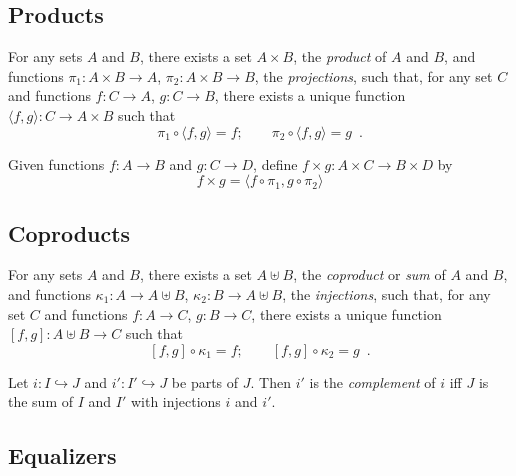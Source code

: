 \subsection{Products}

\begin{ax}[Products]
  For any sets $A$ and $B$, there exists a set $A \times B$, the
  \emph{product} of $A$ and $B$, and functions $\pi_1 : A \times B
  \rightarrow A$, $\pi_2 : A \times B \rightarrow B$, the \emph{projections},
  such that, for any set $C$ and functions $f : C \rightarrow A$, $g : C
  \rightarrow B$, there exists a unique function $\langle f, g \rangle : C
  \rightarrow A \times B$ such that
  \[ \pi_1 \circ \langle f, g \rangle = f; \qquad \pi_2 \circ \langle f,g
  \rangle
  = g \enspace . \]
\end{ax}

\begin{df}
  Given functions $f : A \rightarrow B$ and $g : C \rightarrow D$, define $f
  \times g : A \times C \rightarrow B \times D$ by
  \[ f \times g = \langle f \circ \pi_1, g \circ \pi_2 \rangle \]
\end{df}

\subsection{Coproducts}

\begin{ax}[Coproducts]
  For any sets $A$ and $B$, there exists a set $A \uplus B$, the
  \emph{coproduct} or \emph{sum} of $A$ and $B$, and functions $\kappa_1 : A
\rightarrow A
  \uplus B$, $\kappa_2 : B \rightarrow A \uplus B$, the \emph{injections},
  such that, for any set $C$ and functions $f : A \rightarrow C$, $g : B
  \rightarrow C$, there exists a unique function $[f, g] : A \uplus B
  \rightarrow
  C$ such that
  \[ [f,g] \circ \kappa_1 = f; \qquad [f,g] \circ \kappa_2 = g \enspace . \]
\end{ax}

  \begin{df}[Complement]
 Let $i : I \hookrightarrow J$ and $i' : I' \hookrightarrow J$ be parts of
 $J$. Then $i'$ is the \emph{complement} of $i$ iff $J$ is the sum of $I$ and
 $I'$ with injections $i$ and $i'$.
\end{df}


\subsection{Equalizers}

